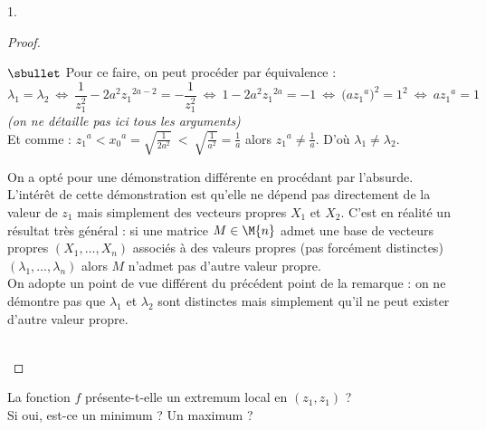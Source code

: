 \begin{noliste}{1.}
\begin{proof}
\begin{remarkL}{.97}
\begin{noliste}{$\sbullet$}
      Pour ce faire, on peut procéder par équivalence :
      \[
      \lambda_1 = \lambda_2 \ \Leftrightarrow \
      \dfrac{1}{z_1^2}-2a^2z_1{}^{2a-2} = -\dfrac{1}{z_1^2} \
      \Leftrightarrow \ 1-2a^2z_1{}^{2a} = -1
      \ \Leftrightarrow \ \big( a z_1{}^a \big)^2 = 1^2 \
      \Leftrightarrow \ a z_1{}^a = 1 
      \]
      {\it (on ne détaille pas ici tous les arguments)}\\
      Et comme : $z_1{}^a < x_0{}^a = \sqrt{\frac{1}{2a^2}} \ < \
      \sqrt{\frac{1}{a^2}} = \frac{1}{a}$ alors $z_1{}^a \neq
      \frac{1}{a}$. D'où $\lambda_1 \neq \lambda_2$.

    \item On a opté pour une démonstration différente en procédant par
      l'absurde. L'intérêt de cette démonstration est qu'elle ne
      dépend pas directement de la valeur de $z_1$ mais simplement des
      vecteurs propres $X_1$ et $X_2$. C'est en réalité un résultat
      très général : si une matrice $M \in \M{n}$ admet une base de
      vecteurs propres $(X_1, \ldots, X_n)$ associés à des valeurs
      propres (pas forcément distinctes) $(\lambda_1, \ldots,
      \lambda_n)$ alors $M$ n'admet pas d'autre valeur propre.\\
      On adopte un point de vue différent du précédent point de la
      remarque : on ne démontre pas que $\lambda_1$ et $\lambda_2$
      sont distinctes mais simplement qu'il ne peut exister d'autre
      valeur propre.
    \end{noliste}
  \end{remarkL}~\\[-1.4cm]
\end{proof}


\newpage


\item La fonction $f$ présente-t-elle un extremum local en $(z_1,z_1)$
  ? \\
  Si oui, est-ce un minimum ? Un maximum ?


\end{noliste}
